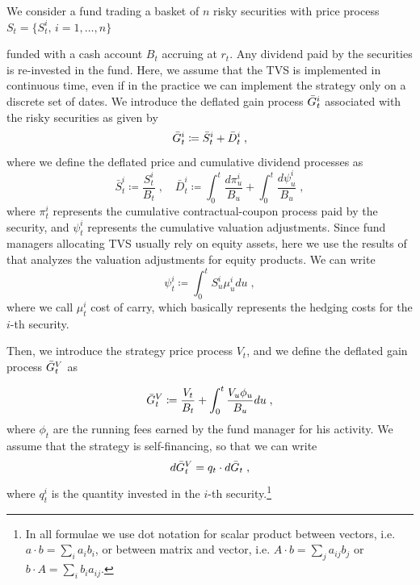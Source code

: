 \documentclass[runningheads]{m2ef}
\newcommand\soutpars[1]{\let\helpcmd\sout\parhelp#1\par\relax\relax}
\newcommand{\change}[1]{{\color{red} {#1}}}%
\newcommand{\remove}[1]{{\color{red} \soutpars{{#1}}}}%
\begin{document}
We consider a fund trading a basket of $n$ risky securities with price process \change{$S_t = \{S_t^i, \, i=1,\dots,n\}$} \remove{$S_t = (S_t^i, \, i=1,\dots,n)$} funded with a cash account $B_t$ accruing at $r_t$. Any dividend paid by the securities is re-invested in the fund. Here, we assume that the TVS is implemented in continuous time, even if in the practice we can implement the strategy only on a discrete set of dates. We introduce the deflated gain process $\Bar{G}_t^i$ associated with the risky securities as given by
\begin{equation}
    \Bar{G}_t^i \coloneqq \Bar{S}_t^i + \Bar{D}_t^i \; ,
\end{equation}
where we define the deflated price and cumulative dividend processes as 
\begin{equation}
    \bar{S}_t^i \coloneqq \frac{S_t^i}{B_t} \; , \quad \bar{D}^i_t \coloneqq \int_0^t\frac{d\pi_u^i}{B_u} + \int_0^t\frac{d\psi_u^i}{B_u} \; ,
\end{equation}
where $\pi^i_t$ represents the cumulative contractual-coupon process paid by the security, and $\psi_t^i$ represents the cumulative valuation adjustments.
Since fund managers allocating TVS usually rely on equity assets, here we use the results of \cite{Gabrielli2020} that analyzes the valuation adjustments for equity products. We can write 
\begin{equation}
    \psi_t^i \coloneqq \int_0^t S_u^i\mu_u^i du \; ,
\label{eq:XVA_equity}\end{equation}
where we call $\mu_t^i$ cost of carry, which basically represents the hedging costs for the $i$-th security.

Then, we introduce the strategy price process $V_t$, and we define the deflated gain process $\Bar{G}_t^V$ as \remove{given by}
\begin{equation}
    \Bar{G}_t^V \coloneqq \frac{V_t}{B_t} + \int_0^t\frac{V_u\phi_u}{B_u}du \; ,
\end{equation}
where $\phi_t$ are the running fees earned by the fund manager for his activity. We assume that the strategy is self-financing, so that we can write
\begin{equation}
    d\Bar{G}_t^V = q_t \cdot d\bar{G}_t \; ,
\label{eq:self_financing}\end{equation}
where $q_t^i$ is the quantity invested in the $i$-th security.\footnote{In all formulae we use dot notation for scalar product between vectors, i.e. $a \cdot b = \sum_i a_i b_i$, or between matrix and vector, i.e. $A \cdot b = \sum_j a_{ij}b_j$ or $b \cdot A = \sum_i b_i a_{ij}$.}
\end{document}
